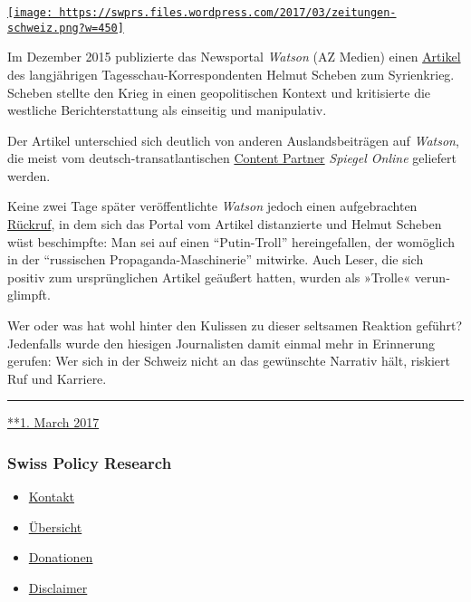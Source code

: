 \href{https://swprs.org/2017/03/01/das-gewuenschte-narrativ-ii/}{\texttt{[image: https://swprs.files.wordpress.com/2017/03/zeitungen-schweiz.png?w=450]}}

Im Dezember 2015 publi­zierte das News­portal \emph{Watson} (AZ Medien)
einen \href{https://www.watson.ch/!148360008}{Artikel} des lang­jährigen
Tages­schau-Kor­res­pon­denten Hel­mut Sche­­ben zum Syrien­krieg.
Scheben stellte den Krieg in einen geo­po­li­tischen Kontext und
kri­ti­sierte die westliche Be­richt­er­stattung als einseitig und
ma­ni­pu­la­tiv.

Der Artikel un­ter­schied sich deutlich von anderen Aus­lands­bei­trägen
auf \emph{Watson}, die meist vom deutsch-transatlantischen
\href{https://www.watson.ch/Corporate/articles/502582965-Spiegel-Online-und-watson-machen-gemeinsame-Sache}{Content
Partner} \emph{Spiegel Online} geliefert werden.

Keine zwei Tage später veröffentlichte \emph{Watson} jedoch einen
aufgebrachten \href{https://www.watson.ch/!491379853}{Rückruf}, in dem
sich das Portal vom Artikel distanzierte und Helmut Scheben wüst
beschimpfte: Man sei auf einen ``Putin-Troll'' herein­ge­fallen, der
wo­möglich in der ``russischen Propaganda-Maschinerie'' mit­wirke. Auch
Leser, die sich positiv zum ur­sprüng­lichen Artikel geäußert hatten,
wurden als »Trolle« verun­glimpft.

Wer oder was hat wohl hinter den Kulissen zu dieser selt­samen Reak­tion
geführt? Jeden­falls wurde den hiesigen Journa­listen damit einmal mehr
in Er­in­nerung gerufen: Wer sich in der Schweiz nicht an das
ge­wünschte Nar­ra­tiv hält, ris­kiert Ruf und Karriere.

\begin{center}\rule{0.5\linewidth}{\linethickness}\end{center}

\href{https://swprs.org/2017/03/01/das-gewuenschte-narrativ-ii/}{**1.
March 2017}

\hypertarget{swiss-policy-research}{%
\subsubsection{Swiss Policy Research}\label{swiss-policy-research}}

\begin{itemize}
\tightlist
\item
  \href{https://swprs.org/kontakt/}{Kontakt}
\item
  \href{https://swprs.org/uebersicht/}{Übersicht}
\item
  \href{https://swprs.org/donationen/}{Donationen}
\item
  \href{https://swprs.org/disclaimer/}{Disclaimer}
\end{itemize}

